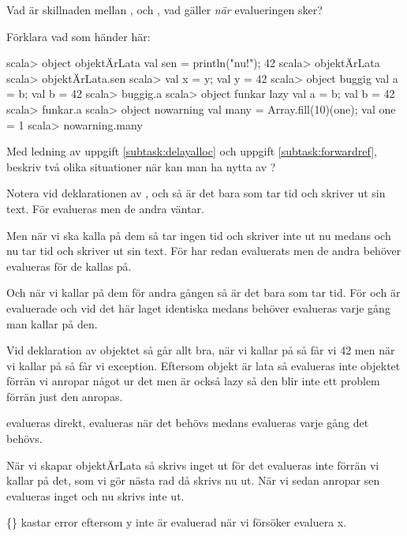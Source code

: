 \Subtask Vad är skillnaden mellan ,  och , vad gäller \emph{när} evalueringen sker?


\Subtask \label{subtask:forwardref} Förklara vad som händer här:
\begin{REPL}
scala> object objektÄrLata { val sen = { println("nu!"); 42 } }
scala> objektÄrLata
scala> objektÄrLata.sen
scala> {val x = y; val y = 42}
scala> object buggig {val a = b; val b = 42}
scala> buggig.a
scala> object funkar {lazy val a = b; val b = 42}
scala> funkar.a
scala> object nowarning {val many = Array.fill(10)(one); val one = 1}
scala> nowarning.many
\end{REPL}

\Subtask Med ledning av uppgift \ref{subtask:delayalloc} och uppgift \ref{subtask:forwardref}, beskriv två olika situationer när kan man ha nytta av ?


\SOLUTION


\TaskSolved \what


\SubtaskSolved  Notera vid deklarationen av ,  och  så är det bara  som tar tid och skriver ut sin text. För  evalueras men de andra väntar.

Men när vi ska kalla på dem så tar  ingen tid och skriver inte ut nu medans  och  nu tar tid och skriver ut sin text. För  har redan evaluerats men de andra behöver evalueras för de kallas på.

Och när vi kallar på dem för andra gången så är det bara  som tar tid. För  och  är evaluerade och vid det här laget identiska medans  behöver evalueras varje gång man kallar på den.

Vid deklaration av objektet så går allt bra, när vi kallar på  så får vi 42 men när vi kallar på  så får vi exception. Eftersom objekt är lata så evalueras inte objektet förrän vi anropar något ur det men  är också lazy så den blir inte ett problem förrän just den anropas.

\SubtaskSolved
{} evalueras direkt,  evalueras när det behövs medans  evalueras varje gång det behövs.

\SubtaskSolved
När vi skapar objektÄrLata så skrivs inget ut för det evalueras inte förrän vi kallar på det, som vi gör nästa rad då skrivs nu ut. När vi sedan anropar sen evalueras inget och nu skrivs inte ut.

\{\} kastar error eftersom y inte är evaluerad när vi försöker evaluera x.

